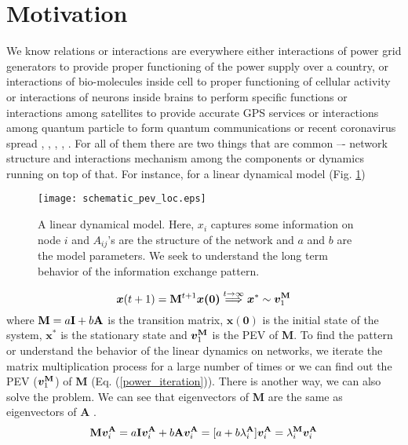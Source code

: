 \documentclass[envcountreset,oribibl]{llncs}
\begin{document}
\section{Motivation}
We know relations or interactions are everywhere either interactions of power grid generators to provide proper functioning of the power supply over a country, or interactions of bio-molecules inside cell to proper functioning of cellular activity or interactions of neurons inside brains to perform specific functions or interactions among satellites to provide accurate GPS services or interactions among quantum particle to form quantum communications or recent coronavirus spread \cite{rev_Strogatz_2001}, \cite{dynamic_reconfig_2011}, \cite{quantum_internet}, \cite{GPS_network}, \cite{COVID-19}. For all of them there are two things that are common –- network structure and interactions mechanism among the components or dynamics running on top of that. For instance, for a linear dynamical model (Fig. \ref{schematic_pev_lov}) 
\begin{figure}[t]
\begin{center}
\texttt{[image: schematic\_pev\_loc.eps]}
\caption{A linear dynamical model. Here, $x_i$ captures some information on node $i$ and $A_{ij}$'s are the structure of the network and $a$ and $b$ are the model parameters. We seek to understand the long term behavior of the information exchange pattern.}
\label{schematic_pev_lov}
\end{center}
\end{figure}
\begin{equation}\label{power_iteration}
\bm{x}(t+1) =  {\bf M}^{t+1} \bm{x(0)}\overset{t\rightarrow \infty}{\Longrightarrow} \bm{x}^{*} \sim  \bm{v}_1^{\bf M}  
\end{equation}
where ${\bf M}=a{\bf I}+b{\bf A}$ is the transition matrix, $\bm{x(0)}$ is the initial state of the system, $\bm{x}^{*}$ is the stationary state and $\bm{v}_1^{\bf M}$ is the PEV of {\bf M}. To find the pattern or understand the behavior of the linear dynamics on networks, we iterate the matrix multiplication process for a large number of times or we can find out the PEV ($\bm{v}_1^{\bf M}$) of {\bf M} (Eq. (\ref{power_iteration})). There is another way, we can also solve the problem. We can see that eigenvectors of {\bf M} are the same as eigenvectors of {\bf A} \cite{pevec_nat_phys_2013}.
\begin{equation}\nonumber
{\bf M}\bm{v}_i^{\bf A}=a{\bf I}\bm{v}_i^{\bf A}+b{\bf A}\bm{v}_i^{\bf A}
    =[a+b\lambda_i^{\bf A}]\bm{v}_i^{\bf A}
    =\lambda_i^{\bf M}\bm{v}_i^{\bf A}
\end{equation}
\end{document}
